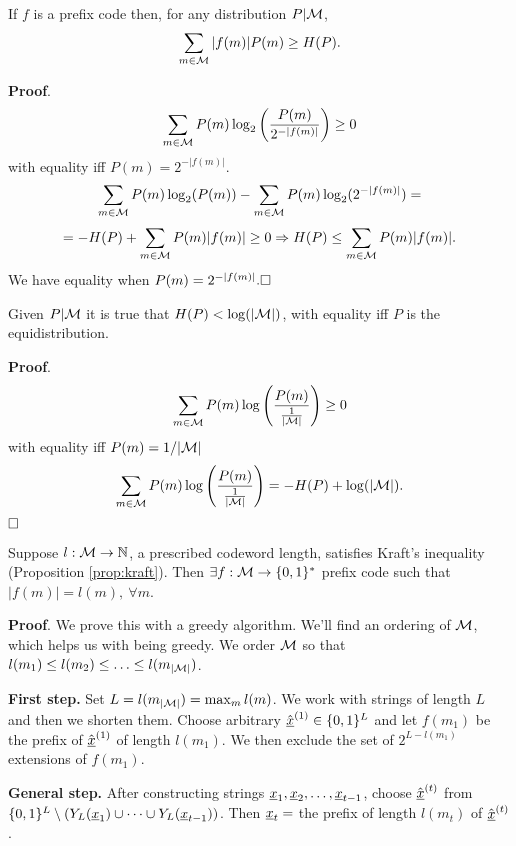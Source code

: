 \begin{prop}
	If $f$ is a prefix code then, for any distribution $P|\mathcal{M}$, $$\sum_{m\in\mathcal{M}}|f(m)|P(m) \geq H(P).$$
\end{prop}

\noindent\textbf{Proof}.
\[
\sum_{m \in\mathcal{M}}P(m) \log_2\left(\dfrac{P(m)}{2^{-|f(m)|}}\right) \geq 0
\]
with equality iff $P(m) = 2^{-|f(m)|}$.
\[
\sum_{m\in\mathcal{M}}P(m)\log_2(P(m)) - \sum_{m\in\mathcal{M}}P(m)\log_2(2^{-|f(m)|}) =
\]
\[
= -H(P) + \sum_{m\in\mathcal{M}}P(m)|f(m)| \geq 0 \Rightarrow H(P) \leq \sum_{m\in\mathcal{M}}P(m)|f(m)|.
\]
We have equality when $P(m) = 2^{-|f(m)|}.\hfill\Box$

\begin{obs}
	Given $P|\mathcal{M}$ it is true that $H(P) < \log(|\mathcal{M}|)$, with equality iff $P$ is the equidistribution.
\end{obs}

\noindent\textbf{Proof}.
\[
\sum_{m\in\mathcal{M}}P(m)\log\left(\dfrac{P(m)}{\frac{1}{|\mathcal{M}|}} \right) \geq 0
\]
with equality iff $P(m) = {1}/{|\mathcal{M}|}$
\[
\sum_{m\in\mathcal{M}}P(m)\log\left(\dfrac{P(m)}{\frac{1}{|\mathcal{M}|}} \right) = -H(P)+\log(|\mathcal{M}|).
\]
$\hfill\Box$

\begin{thm}[Kraft]
	Suppose $l:\mathcal{M} \rightarrow \mathbb{N}$, a prescribed codeword length, satisfies Kraft's inequality (Proposition \ref{prop:kraft}). Then 
	$\exists f:\mathcal{M} \rightarrow \{0, 1\}^*$ prefix code such that $|f(m)| = l(m),\ \forall m$.
\end{thm}

\noindent\textbf{Proof}. We prove this with a greedy algorithm. We'll find an ordering of $\mathcal{M}$, which helps us with being greedy. We order $\mathcal{M}$ so that $l(m_1) \leq l(m_2) \leq \ldots \leq l(m_{|\mathcal{M}|})$.

\noindent\textbf{First step.} Set $L = l(m_{|\mathcal{M}|}) = \max_ml(m)$. We work with strings of length $L$ and then we shorten them. Choose arbitrary $\hat{\underline{x}}^{(1)} \in \{0, 1\}^L$ and let $f(m_1)$ be the prefix of $\hat{\underline{x}}^{(1)}$ of length $l(m_1)$. We then exclude the set of $2^{L - l(m_1)}$ extensions of $f(m_1)$.

\noindent\textbf{General step.} After constructing strings $\underline{x}_1,\underline{x}_2, \ldots, \underline{x}_{t-1}$, choose $\hat{\underline{x}}^{(t)}$ from $\{0, 1\}^L \setminus (Y_L(\underline{x}_1) \cup \cdots \cup Y_L(\underline{x}_{t-1}))$. Then $\underline{x}_t = $ the prefix of length $l(m_t)$ of $\hat{\underline{x}}^{(t)}$.

